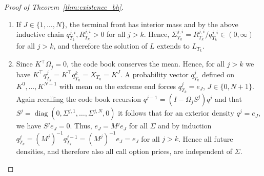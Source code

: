 \documentclass[11pt]{article}
\DeclareMathOperator{\diag}{diag}
\theoremstyle{plain}
\theoremstyle{definition}
\theoremstyle{remark}
\begin{document}
\begin{proof}[Proof of Theorem~\ref{thm:existence_bh}]
\begin{enumerate}[label=(\roman*)]
  Next we show that a single zero-valued interior density node forces all interior nodes to be zero-valued. In contrast, a single positive-valued interior node spreads to all interior nodes. Abbreviate $p=q^{j-1}$, $q=q^j$, $R=R^j$ at time $\zeta$ and write out row $i$ of \eqref{eq:R_codebook_mw}: 
  \begin{equation*}
    p_i = q_i+( \gamma^{-i} + \gamma^{+i} ) R_i - \gamma^{ +(i-1)} R_{i-1} - \gamma^{ -(i+1)} R_{i+1}.
  \end{equation*}
  From Lemma~\ref{lem:zero_sets_bh} (b) we know that $q_i = 0$ iff $R_i = 0$. Hence, if $q_i = 0$, then also $R_i = 0$ and $p_i = - \gamma^{ +(i-1)} R_{i-1} - \gamma^{ -(i+1)} R_{i+1}$. The left-hand side, $p_i$, is non-negative and the right-hand side non-positive. Therefore $p_i = 0$ and $R_{i\pm1} = 0$ and again by Lemma~\ref{lem:zero_sets_bh} (b) $q_{i\pm1} = 0$. This argument spreads across the grid such that all interior nodes have to be equal to zero. Mass can only be attained on an outer node. Conversely, if $q^{j-1}$ has interior mass then the chain above cannot start and all $q^{j, i}$, and thus $R^{j, i}$, are positive. 

  Now, suppose that $\zeta < T_k$. Then the Brownian motion $B_\zeta$ is finite, and the front density $q^k_\zeta$ still has interior mass. Applying the above inductive chain for $j = k+1, \dots, M$ we obtain that $\Sigma^{j, i}_{\zeta-} = R^{j, i}_{\zeta-} / q_{\zeta-}^{j, i} \in (0, \infty)$. Hence, $L$ has a finite limit at $\zeta$ which means it could be extended to $\zeta$, contradicting the maximality of $\zeta$. Therefore $\zeta = T_k$, which proves existence. 
  

  \item If $J \in \lbrace 1, \dots, N \rbrace $, the terminal front has interior mass and by the above inductive chain $q^{j,i}_{T_k},R^{j,i}_{T_k}>0$ for all $j > k$. Hence, $\Sigma^{j, i}_{T_k} = R^{j, i}_{T_k} / q^{j, i}_{T_k} \in (0, \infty)$ for all $j > k$, and therefore the solution of $L$ extends to $L_{T_k}$. 
  
  \item Since $K^\top \Omega_j = 0$, the code book conserves the mean. Hence, for all $j > k$ we have $K^\top q^j_{T_k} = K^\top q^k_{T_k} = X_{T_k} = K^J$. A probability vector $q^{j}_{T_k}$ defined on $K^0, \dots, K^{N+1}$ with mean on the extreme end forces $q^j_{T_k} = e_J$, $J \in \lbrace 0, N+1 \rbrace$. Again recalling the code book recursion $q^{j-1} = (I - \Omega_j S^j) q^j$ and that $S^j = \diag(0, \Sigma^{j, 1}, \dots, \Sigma^{j, N}, 0)$ it follows that for an exterior density $q^j = e_J$, we have $S^j e_J = 0$. Thus, $e_J = M^j e_J$ for all $\Sigma$ and by induction $ q^{j}_{T_k} = (M^j)^{-1} q^{j-1}_{T_k} = (M^j)^{-1} e_J = e_J$ for all $j > k$. Hence all future densities, and therefore also all call option prices, are independent of $\Sigma$. 
\end{enumerate}
\end{proof}
\end{document}
